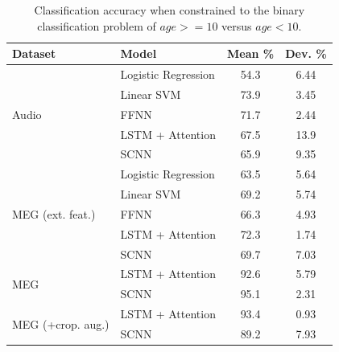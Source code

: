 \documentclass[fleqn,10pt]{wlscirep}
\begin{document}
\begin{table}[htp]
  \caption{Classification accuracy when constrained to the binary classification problem of $age >= 10$ versus $age < 10$.}
  \centering
  \begin{tabular}{l l | c | c}
    \toprule
    \textbf{Dataset} & \textbf{Model} & \textbf{Mean \%} & \textbf{Dev. \%} \\
    \toprule
    \multirow{5}{*}{Audio}
                         & Logistic Regression    & 54.3 & 6.44  \\
                         & Linear SVM             & 73.9 & 3.45  \\
                         & FFNN                   & 71.7 & 2.44  \\
                         & LSTM + Attention       & 67.5 & 13.9  \\
                         & SCNN                   & 65.9 & 9.35  \\
    \midrule
    \multirow{5}{*}{MEG (ext. feat.)}
                         & Logistic Regression    & 63.5 & 5.64  \\
                         & Linear SVM             & 69.2 & 5.74  \\
                         & FFNN                   & 66.3 & 4.93  \\
                         & LSTM + Attention       & 72.3 & 1.74  \\
                         & SCNN                   & 69.7 & 7.03  \\
    
    \midrule
    \multirow{2}{*}{MEG}
                         & LSTM + Attention    & 92.6 & 5.79  \\ 
                         & SCNN                & 95.1 & 2.31  \\
    \midrule
    \multirow{2}{*}{MEG (+crop. aug.)}
                         & LSTM + Attention    & 93.4 & 0.93  \\ 
                         & SCNN                & 89.2 & 7.93  \\
    
    \bottomrule
  \end{tabular}
  \label{tab:binary_results}
\end{table}
\end{document}

